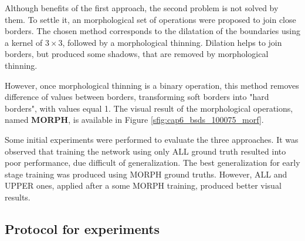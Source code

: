 
Although benefits of the first approach, the second problem is not solved by them.
To settle it, an morphological set of operations were proposed to join close borders.
The chosen method corresponds to the dilatation of the boundaries using a kernel of $3 \times 3$, followed by a morphological thinning.
Dilation helps to join borders, but produced some shadows, that are removed by morphological thinning.

However, once morphological thinning is a binary operation, this method removes difference of values between borders, transforming soft borders into "hard borders", with values equal 1. 
The visual result of the morphological operations, named \textbf{MORPH}, is available in Figure \ref{sfig:cap6_bsds_100075_morf}.


Some initial experiments were performed to evaluate the three approaches.
It was observed that training the network using only ALL ground truth resulted into poor performance, due difficult of generalization.
The best generalization for early stage training was produced using MORPH ground truths.
However, ALL and UPPER ones, applied after a some MORPH training, produced better visual results.

\subsection{Protocol for experiments}
\label{ssec:framework_experiments}

